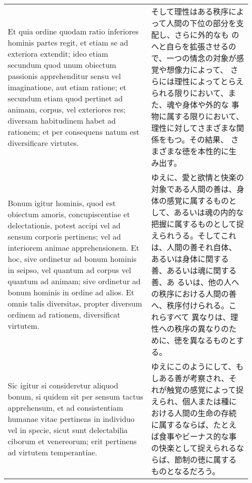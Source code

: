 \documentclass[10pt]{jsarticle}
\begin{document}
\begin{longtable}{p{21em}p{21em}}
 
\\


 Et quia ordine quodam ratio inferiores hominis partes regit, et etiam
 se ad exteriora extendit; ideo etiam secundum quod unum obiectum
 passionis apprehenditur sensu vel imaginatione, aut etiam ratione; et
 secundum etiam quod pertinet ad animam, corpus, vel exteriores res;
 diversam habitudinem habet ad rationem; et per consequens natum est
 diversificare virtutes.

&

 そして理性はある秩序によって人間の下位の部分を支配し、さらに外的なも
 のへと自らを拡張させるので、一つの情念の対象が感覚や想像力によって、
 さらには理性によってとらえられる限りにおいて、また、魂や身体や外的な
 事物に属する限りにおいて、理性に対してさまざまな関係をもつ。その結果、
 さまざまな徳を本性的に生み出す。
 
\\

 Bonum igitur hominis, quod est obiectum amoris, concupiscentiae et
 delectationis, potest accipi vel ad sensum corporis pertinens; vel ad
 interiorem animae apprehensionem. Et hoc, sive ordinetur ad bonum
 hominis in seipso, vel quantum ad corpus vel quantum ad animam; sive
 ordinetur ad bonum hominis in ordine ad alios. Et omnis talis
 diversitas, propter diversum ordinem ad rationem, diversificat
 virtutem.

&

ゆえに、愛と欲情と快楽の対象である人間の善は、身体の感覚に属するものと
して、あるいは魂の内的な把握に属するものとして捉えられうる。そしてこれ
は、人間の善それ自体、あるいは身体に関する善、あるいは魂に関する善、あ
るいは、他の人への秩序における人間の善へ、秩序付けられる。これらすべて
異なりは、理性への秩序の異なりのために、徳を異なるものとする。
 
\\

 Sic igitur si consideretur aliquod bonum, si quidem sit per sensum
 tactus apprehensum, et ad consistentiam humanae vitae pertinens in
 individuo vel in specie, sicut sunt delectabilia ciborum et
 venereorum; erit pertinens ad virtutem temperantiae.



 &

 ゆえにこのようにして、もしある善が考察され、それが触覚の感覚によって捉えられ、個人または種における人間の生命の存続に属するならば、たとえば食事やビーナス的な事の快楽として捉えられるならば、節制の徳に属するものとなるだろう。

\\




\end{longtable}
\end{document}
